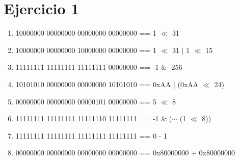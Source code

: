 \documentclass{article}
\begin{document}
	\section*{Ejercicio 1}
	\begin{enumerate}
		\item 10000000 00000000 00000000 00000000 == 1 $\ll$ 31
		\item 10000000 00000000 10000000 00000000 == 1 $\ll$ 31 $|$ 1 $\ll$ 15
		\item 11111111 11111111 11111111 00000000 == -1 \& -256
		\item 10101010 00000000 00000000 10101010 == 0xAA $|$ (0xAA $\ll$ 24)
		\item 00000000 00000000 00000101 00000000 == 5 $\ll$ 8
		\item 11111111 11111111 11111110 11111111 == -1 \& ($\sim$ (1 $\ll$ 8))
		\item 11111111 11111111 11111111 11111111 == 0 - 1 
		\item 00000000 00000000 00000000 00000000 == 0x80000000 + 0x80000000
	\end{enumerate} 
\end{document}

